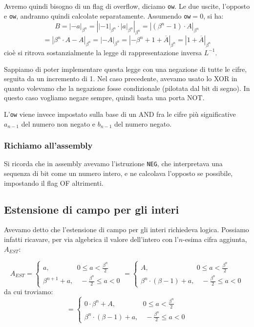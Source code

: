 \documentclass[a4paper,11pt]{article}
\begin{document}
Avremo quindi bisogno di un flag di overflow, diciamo \lstinline|ow|.
Le due uscite, l'opposto e \lstinline|ow|, andranno quindi calcolate separatamente.
Assumendo \lstinline|ow|$=0$, si ha:
$$
B = |-a|_{\beta^n} = \left||-1|_{\beta^n} \cdot |a|_{\beta^n} \right|_{\beta^n} = |(\beta^n - 1) \cdot A|_{\beta^n}
$$
$$
= |\beta^n \cdot A - A |_{\beta^n} = |-A|_{\beta^n} = |-\beta^n + 1 + \overline{A}|_{\beta^n} = |1 + \overline{A}|_{\beta^n}
$$
cioè si ritrova sostanzialmente la legge di rappresentazione inversa $L^{-1}$.

Sappiamo di poter implementare questa legge con una negazione di tutte le cifre, seguita da un incremento di 1.
Nel caso precedente, avevamo usato lo XOR in quanto volevamo che la negazione fosse condizionale (pilotata dal bit di segno).
In questo caso vogliamo negare sempre, quindi basta una porta NOT.

L'\lstinline|ow| viene invece impostato sulla base di un AND fra le cifre più significative $a_{n-1}$ del numero non negato e $b_{n-1}$ del numero negato.

\subsubsection{Richiamo all'assembly}
Si ricorda che in assembly avevamo l'istruzione \lstinline|NEG|, che interpretava una sequenza di bit come un numero intero, e ne calcolava l'opposto se possibile, impostando il flag OF altrimenti.

\subsection{Estensione di campo per gli interi}
Avevamo detto che l'estensione di campo per gli interi richiedeva logica.
Possiamo infatti ricavare, per via algebrica il valore dell'intero con l'$n$-esima cifra aggiunta, $A_{EST}$:

$$
A_{EST} = 
	\begin{cases}
		a, \quad \quad \quad \quad 0 \leq a < \frac{\beta^n}{2} \\ 
		\beta^{n+1} + a, \quad -\frac{\beta^n}{2} \leq a < 0
	\end{cases}
	=
	\begin{cases}
		A, \quad \quad \quad \quad \quad \quad \quad 0 \leq a < \frac{\beta^n}{2} \\ 
		\beta^{n} \cdot (\beta - 1) + a, \quad -\frac{\beta^n}{2} \leq a < 0
	\end{cases}
$$
da cui troviamo:
$$
	=
	\begin{cases}
		0 \cdot \beta^n + A,  \quad \quad \quad \quad 0 \leq a < \frac{\beta^n}{2} \\ 
		\beta^{n} \cdot (\beta - 1) + a, \quad -\frac{\beta^n}{2} \leq a < 0
	\end{cases}
$$
\end{document}
